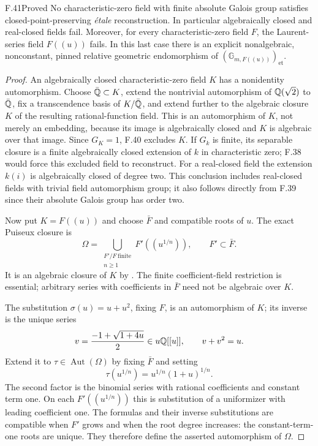 \begin{claim}{F.41}{Proved}
No characteristic-zero field with finite absolute Galois group
satisfies closed-point-preserving \emph{\'etale} reconstruction.
In particular algebraically closed and real-closed fields fail.
Moreover, for every characteristic-zero field $F$, the
Laurent-series field $F((u))$ fails. In this last case there is
an explicit nonalgebraic, nonconstant, pinned relative geometric
endomorphism of $(\mathbb G_{m,F((u))})_{\mathrm{et}}$.
\end{claim}
\begin{proof}
An algebraically closed characteristic-zero field $K$ has a
nonidentity automorphism. Choose $\bar{\mathbb Q}\subset K$, extend
the nontrivial automorphism of $\mathbb Q(\sqrt2)$ to $\bar{\mathbb Q}$,
fix a transcendence basis of $K/\bar{\mathbb Q}$, and extend further
to the algebraic closure $K$ of the resulting rational-function
field. This is an automorphism of $K$, not merely an embedding,
because its image is algebraically closed and $K$ is algebraic
over that image. Since $G_K=1$, F.40 excludes $K$.
If $G_k$ is finite, its separable closure is a finite algebraically
closed extension of $k$ in characteristic zero; F.38 would
force this excluded field to reconstruct. For a real-closed
field the extension $k(i)$ is algebraically closed of degree two.
This conclusion includes real-closed fields with trivial field
automorphism group; it also follows directly from F.39 since
their absolute Galois group has order two.

Now put $K=F((u))$ and choose $\bar F$ and compatible roots
of $u$. The exact Puiseux closure is
\[
 \Omega=\bigcup_{\substack{F'/F\ \mathrm{finite}\\n\ge1}}
                   F'((u^{1/n})),\qquad F'\subset\bar F.
\]
It is an algebraic closure of $K$ by
\citet[Proposition, p.~314]{F_vanDenDriesRibenboim1984}.
The finite coefficient-field restriction is essential;
arbitrary series with coefficients in $\bar F$ need not be
algebraic over $K$.

The substitution $\sigma(u)=u+u^2$, fixing $F$, is an
automorphism of $K$; its inverse is the unique series
\[
 v=\frac{-1+\sqrt{1+4u}}2\in u\mathbb Q[[u]],\qquad v+v^2=u.
\]
Extend it to $\tau\in\operatorname{Aut}(\Omega)$ by fixing
$\bar F$ and setting
\[
 \tau(u^{1/n})=u^{1/n}(1+u)^{1/n}.
\]
The second factor is the binomial series with rational
coefficients and constant term one. On each
$F'((u^{1/n}))$ this is substitution of a uniformizer with
leading coefficient one. The formulas and their inverse
substitutions are compatible when $F'$ grows and when the
root degree increases: the constant-term-one roots are unique.
They therefore define the asserted automorphism of $\Omega$.


\end{proof}
